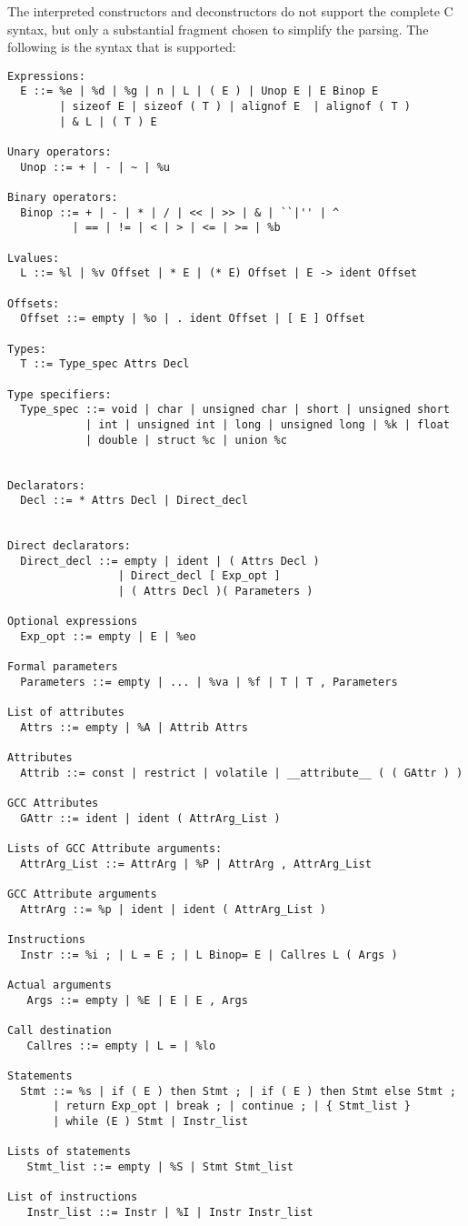 \documentclass{article}
\begin{document}
 The interpreted constructors and deconstructors do not support the complete C
syntax, but only a substantial fragment chosen to simplify the parsing. The
following is the syntax that is supported:
\begin{verbatim}
Expressions:
  E ::= %e | %d | %g | n | L | ( E ) | Unop E | E Binop E 
        | sizeof E | sizeof ( T ) | alignof E  | alignof ( T ) 
        | & L | ( T ) E 

Unary operators:
  Unop ::= + | - | ~ | %u

Binary operators:
  Binop ::= + | - | * | / | << | >> | & | ``|'' | ^ 
          | == | != | < | > | <= | >= | %b

Lvalues:
  L ::= %l | %v Offset | * E | (* E) Offset | E -> ident Offset 

Offsets:
  Offset ::= empty | %o | . ident Offset | [ E ] Offset

Types:
  T ::= Type_spec Attrs Decl

Type specifiers:
  Type_spec ::= void | char | unsigned char | short | unsigned short
            | int | unsigned int | long | unsigned long | %k | float 
            | double | struct %c | union %c 


Declarators:
  Decl ::= * Attrs Decl | Direct_decl


Direct declarators:
  Direct_decl ::= empty | ident | ( Attrs Decl ) 
                 | Direct_decl [ Exp_opt ]
                 | ( Attrs Decl )( Parameters )

Optional expressions
  Exp_opt ::= empty | E | %eo

Formal parameters
  Parameters ::= empty | ... | %va | %f | T | T , Parameters

List of attributes
  Attrs ::= empty | %A | Attrib Attrs

Attributes
  Attrib ::= const | restrict | volatile | __attribute__ ( ( GAttr ) )

GCC Attributes
  GAttr ::= ident | ident ( AttrArg_List )

Lists of GCC Attribute arguments:
  AttrArg_List ::= AttrArg | %P | AttrArg , AttrArg_List

GCC Attribute arguments  
  AttrArg ::= %p | ident | ident ( AttrArg_List )

Instructions
  Instr ::= %i ; | L = E ; | L Binop= E | Callres L ( Args )

Actual arguments
   Args ::= empty | %E | E | E , Args

Call destination
   Callres ::= empty | L = | %lo

Statements
  Stmt ::= %s | if ( E ) then Stmt ; | if ( E ) then Stmt else Stmt ;
       | return Exp_opt | break ; | continue ; | { Stmt_list } 
       | while (E ) Stmt | Instr_list 

Lists of statements
   Stmt_list ::= empty | %S | Stmt Stmt_list  

List of instructions
   Instr_list ::= Instr | %I | Instr Instr_list
\end{verbatim}
\end{document}
